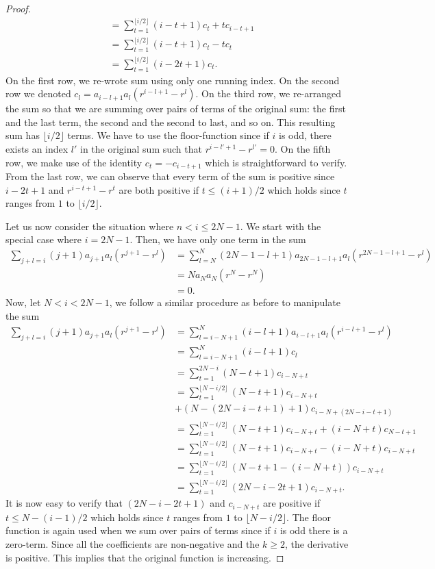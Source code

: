 \begin{proof}
\begin{align*}
&=  \sum_{t =1}^{\lfloor i / 2 \rfloor}(i-t+1)c_t + tc_{i-t+1} \\
&=  \sum_{t =1}^{\lfloor i / 2 \rfloor}(i-t+1)c_t - tc_{t} \\
&= \sum_{t =1}^{\lfloor i / 2 \rfloor}(i-2t+1)c_t.
\end{align*} On the first row, we re-wrote sum using only one running index. On the second row we denoted $c_l =a_{i-l+1}a_l  (r^{i-l+1}- r^l)$. On the third row, we re-arranged the sum so that we are summing over pairs of terms of the original sum: the first and the last term, the second and the second to last, and so on.  This resulting sum has $\lfloor i / 2 \rfloor$ terms. We have to use the floor-function since if $i$ is odd, there exists an index $l'$ in the original sum such that $r^{i-l'+1}-r^{l'} = 0$. On the fifth row, we make use of the identity $c_t = -c_{i-t+1}$ which is straightforward to verify. From the last row, we can observe that every term of the sum is positive since $i-2t+1$ and $r^{i-t+1}- r^t$ are both positive if $t \leq (i+1)/2$ which holds since $t$ ranges from $1$ to $\lfloor i / 2 \rfloor$.

Let us now consider the situation where $n < i \leq 2N-1$. We start with the special case where $i = 2N-1$. Then, we have only one term in the sum
\begin{align*}
\sum_{j+l = i}(j+1)a_{j+1}a_l  (r^{j+1}- r^l) &= \sum_{l=N}^{N}(2N-1-l+1)a_{2N-1-l+1}a_l  (r^{2N-1-l+1}- r^l) \\
&= Na_{N}a_N  (r^{N}- r^N) \\
& = 0.
\end{align*}Now, let $N < i < 2N-1$, we follow a similar procedure as before to manipulate the sum
\begin{align*}
\sum_{j+l = i}(j+1)a_{j+1}a_l  (r^{j+1}- r^l) &= \sum_{l=i-N + 1}^{N}(i-l+1)a_{i-l+1}a_l  (r^{i-l+1}- r^l) \\
& = \sum_{l=i-N + 1}^{N}(i-l+1)c_l \\
& = \sum_{t=1}^{2N-i}(N-t+1)c_{i-N+t} \\
& = \sum_{t=1}^{\lfloor N - i/2 \rfloor}(N-t+1)c_{i-N+t}\\
&+  (N-(2N-i-t+1)+1)c_{i-N+(2N-i-t+1)} \\
&= \sum_{t=1}^{\lfloor N - i/2 \rfloor}(N-t+1)c_{i-N+t} +  (i-N+t)c_{N-t+1} \\
&= \sum_{t=1}^{\lfloor N - i/2 \rfloor}(N-t+1)c_{i-N+t} -  (i-N+t)c_{i-N+t} \\
&= \sum_{t=1}^{\lfloor N - i/2 \rfloor}(N-t+1-(i-N+t))c_{i-N+t} \\
&= \sum_{t=1}^{\lfloor N - i/2 \rfloor}(2N-i-2t+1)c_{i-N+t}.
\end{align*}It is now easy to verify that $(2N-i-2t+1)$ and $c_{i-N+t}$ are positive if $t \leq N - (i-1)/2$ which holds since $t$ ranges from $1$ to $\lfloor N - i/2 \rfloor$. The floor function is again used when we sum over pairs of terms since if $i$ is odd there is a zero-term. 
Since all the coefficients are non-negative and the $k \geq 2$, the derivative is positive. This implies that the original function is increasing.
\end{proof}


